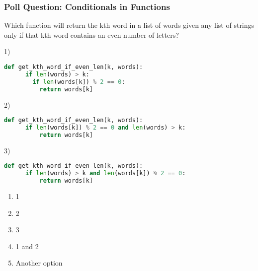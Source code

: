 \documentclass{beamer}
\begin{document}
%
%
\begin{frame}[fragile]
	\frametitle{Poll Question: Conditionals in Functions}
  Which function will return the kth word in a list of words given any list of strings only if that kth word contains an even number of letters?
	\vfill
	\begin{minipage}{0.7\textwidth}
    1)
		\begin{lstlisting}[language=Python, autogobble,basicstyle=\tiny,numbers=none]
    def get_kth_word_if_even_len(k, words):
      if len(words) > k:
        if len(words[k]) % 2 == 0:
          return words[k]
		\end{lstlisting}
    2)
		\begin{lstlisting}[language=Python, autogobble,basicstyle=\tiny,numbers=none]
    def get_kth_word_if_even_len(k, words):
      if len(words[k]) % 2 == 0 and len(words) > k:
          return words[k]
		\end{lstlisting}
    3)
		\begin{lstlisting}[language=Python, autogobble,basicstyle=\tiny,numbers=none]
    def get_kth_word_if_even_len(k, words):
      if len(words) > k and len(words[k]) % 2 == 0:
          return words[k]
		\end{lstlisting}
	\end{minipage}
  \begin{minipage}{0.29\textwidth}
    \begin{enumerate}[A]
      \item 1
      \item 2
      \item 3
      \item 1 and 2
      \item Another option
    \end{enumerate}
	\end{minipage}
\end{frame}
\end{document}
